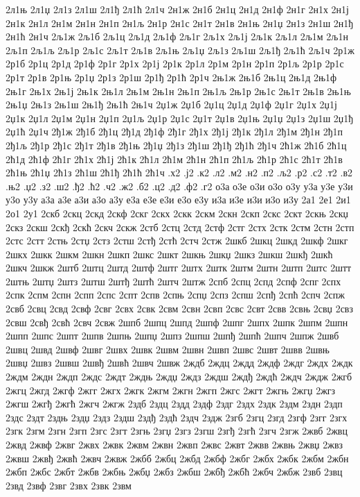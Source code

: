 {2л1њ
2л1џ
2л1з
2л1ш
2л1ђ
2л1ћ
2л1ч
2н1ж
2н1б
2н1ц
2н1д
2н1ф
2н1г
2н1х
2н1ј
2н1к
2н1л
2н1м
2н1н
2н1п
2н1љ
2н1р
2н1с
2н1т
2н1в
2н1њ
2н1џ
2н1з
2н1ш
2н1ђ
2н1ћ
2н1ч
2љ1ж
2љ1б
2љ1ц
2љ1д
2љ1ф
2љ1г
2љ1х
2љ1ј
2љ1к
2љ1л
2љ1м
2љ1н
2љ1п
2љ1љ
2љ1р
2љ1с
2љ1т
2љ1в
2љ1њ
2љ1џ
2љ1з
2љ1ш
2љ1ђ
2љ1ћ
2љ1ч
2р1ж
2р1б
2р1ц
2р1д
2р1ф
2р1г
2р1х
2р1ј
2р1к
2р1л
2р1м
2р1н
2р1п
2р1љ
2р1р
2р1с
2р1т
2р1в
2р1њ
2р1џ
2р1з
2р1ш
2р1ђ
2р1ћ
2р1ч
2њ1ж
2њ1б
2њ1ц
2њ1д
2њ1ф
2њ1г
2њ1х
2њ1ј
2њ1к
2њ1л
2њ1м
2њ1н
2њ1п
2њ1љ
2њ1р
2њ1с
2њ1т
2њ1в
2њ1њ
2њ1џ
2њ1з
2њ1ш
2њ1ђ
2њ1ћ
2њ1ч
2џ1ж
2џ1б
2џ1ц
2џ1д
2џ1ф
2џ1г
2џ1х
2џ1ј
2џ1к
2џ1л
2џ1м
2џ1н
2џ1п
2џ1љ
2џ1р
2џ1с
2џ1т
2џ1в
2џ1њ
2џ1џ
2џ1з
2џ1ш
2џ1ђ
2џ1ћ
2џ1ч
2ђ1ж
2ђ1б
2ђ1ц
2ђ1д
2ђ1ф
2ђ1г
2ђ1х
2ђ1ј
2ђ1к
2ђ1л
2ђ1м
2ђ1н
2ђ1п
2ђ1љ
2ђ1р
2ђ1с
2ђ1т
2ђ1в
2ђ1њ
2ђ1џ
2ђ1з
2ђ1ш
2ђ1ђ
2ђ1ћ
2ђ1ч
2ћ1ж
2ћ1б
2ћ1ц
2ћ1д
2ћ1ф
2ћ1г
2ћ1х
2ћ1ј
2ћ1к
2ћ1л
2ћ1м
2ћ1н
2ћ1п
2ћ1љ
2ћ1р
2ћ1с
2ћ1т
2ћ1в
2ћ1њ
2ћ1џ
2ћ1з
2ћ1ш
2ћ1ђ
2ћ1ћ
2ћ1ч
.х2
.ј2
.к2
.л2
.м2
.н2
.п2
.љ2
.р2
.с2
.т2
.в2
.њ2
.џ2
.з2
.ш2
.ђ2
.ћ2
.ч2
.ж2
.б2
.ц2
.д2
.ф2
.г2
о3а
о3е
о3и
о3о
о3у
у3а
у3е
у3и
у3о
у3у
а3а
а3е
а3и
а3о
а3у
е3а
е3е
е3и
е3о
е3у
и3а
и3е
и3и
и3о
и3у
2а1
2е1
2и1
2о1
2у1
2скб
2скц
2скд
2скф
2скг
2скх
2скк
2скм
2скн
2скп
2скс
2скт
2скњ
2скџ
2скз
2скш
2скђ
2скћ
2скч
2скж
2стб
2стц
2стд
2стф
2стг
2стх
2стк
2стм
2стн
2стп
2стс
2стт
2стњ
2стџ
2стз
2стш
2стђ
2стћ
2стч
2стж
2шкб
2шкц
2шкд
2шкф
2шкг
2шкх
2шкк
2шкм
2шкн
2шкп
2шкс
2шкт
2шкњ
2шкџ
2шкз
2шкш
2шкђ
2шкћ
2шкч
2шкж
2штб
2штц
2штд
2штф
2штг
2штх
2штк
2штм
2штн
2штп
2штс
2штт
2штњ
2штџ
2штз
2штш
2штђ
2штћ
2штч
2штж
2спб
2спц
2спд
2спф
2спг
2спх
2спк
2спм
2спн
2спп
2спс
2спт
2спв
2спњ
2спџ
2спз
2спш
2спђ
2спћ
2спч
2спж
2свб
2свц
2свд
2свф
2свг
2свх
2свк
2свм
2свн
2свп
2свс
2свт
2свв
2свњ
2свџ
2свз
2свш
2свђ
2свћ
2свч
2свж
2шпб
2шпц
2шпд
2шпф
2шпг
2шпх
2шпк
2шпм
2шпн
2шпп
2шпс
2шпт
2шпв
2шпњ
2шпџ
2шпз
2шпш
2шпђ
2шпћ
2шпч
2шпж
2швб
2швц
2швд
2швф
2швг
2швх
2швк
2швм
2швн
2швп
2швс
2швт
2швв
2швњ
2швџ
2швз
2швш
2швђ
2швћ
2швч
2швж
2ждб
2ждц
2ждд
2ждф
2ждг
2ждх
2ждк
2ждм
2ждн
2ждп
2ждс
2ждт
2ждњ
2ждџ
2ждз
2ждш
2ждђ
2ждћ
2ждч
2ждж
2жгб
2жгц
2жгд
2жгф
2жгг
2жгх
2жгк
2жгм
2жгн
2жгп
2жгс
2жгт
2жгњ
2жгџ
2жгз
2жгш
2жгђ
2жгћ
2жгч
2жгж
2здб
2здц
2здд
2здф
2здг
2здх
2здк
2здм
2здн
2здп
2здс
2здт
2здњ
2здџ
2здз
2здш
2здђ
2здћ
2здч
2здж
2згб
2згц
2згд
2згф
2згг
2згх
2згк
2згм
2згн
2згп
2згс
2згт
2згњ
2згџ
2згз
2згш
2згђ
2згћ
2згч
2згж
2жвб
2жвц
2жвд
2жвф
2жвг
2жвх
2жвк
2жвм
2жвн
2жвп
2жвс
2жвт
2жвв
2жвњ
2жвџ
2жвз
2жвш
2жвђ
2жвћ
2жвч
2жвж
2жбб
2жбц
2жбд
2жбф
2жбг
2жбх
2жбк
2жбм
2жбн
2жбп
2жбс
2жбт
2жбв
2жбњ
2жбџ
2жбз
2жбш
2жбђ
2жбћ
2жбч
2жбж
2звб
2звц
2звд
2звф
2звг
2звх
2звк
2звм
}
